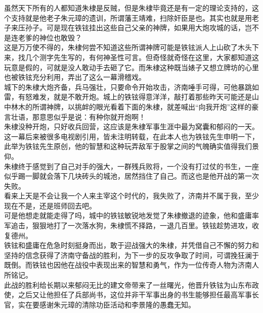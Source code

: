 \begin{multicols}{\theparacolNo}
虽然天下所有的人都知道朱棣是反贼，但是朱棣毕竟还是有一定的理论支持的，这个支持就是他老子朱元璋的遗训，所谓藩王靖难，扫除奸臣是也。其实也就是用老子来压孙子。可是现在铁铉挂出这些自己父亲的神牌，如果用大炮攻城的话，岂不是连老爹的神位也敢毁？\\

这是万万使不得的，朱棣何尝不知道这些所谓神牌可能是铁铉派人上山砍了木头下来，找几个测字先生写的，有何神圣性可言。但奇怪就奇怪在这里，大家都知道这玩意是假的，可就是没人敢动手去砸了它。而朱棣这种既当婊子又想立牌坊的心里也被铁铉充分利用，弄出了这么一幕滑稽戏。\\

城下的朱棣大炮齐备，兵马强壮，只要命令开始攻击，济南唾手可得，可他暴跳如雷，有怒难发，就是不敢开炮。城上的铁铉得意洋洋，敲打着那些昨天可能还是山中林木的所谓神牌，以挑衅的眼光看着下面的朱棣，就差喊出“向我开炮”这样的豪言壮语，那意思似乎是说：有种你就开炮啊！\\

朱棣没种开炮，只好收兵回营，这应该是朱棣军事生涯中最为窝囊和郁闷的一天。\\

这一幕后来被很多电视剧引用，皆未注明转载，在此本人也为铁铉先生申明一下，此举为铁铉先生原创，他的智慧和这种玩弄敌军于股掌之间的气魄确实值得我们景仰。\\

朱棣终于感觉到了自己对手的强大，一群残兵败将，一个没有打过仗的书生，一座似乎踢一脚就会落下几块砖头的城池，居然挡住了自己。而这也是他开战的第一次失败。\\

看来上天是不会让我一个人来主宰这个时代的，我失败了，济南并不属于我，至少现在不是，还是班师回去吧。\\

可是他想走就能走得了吗，城中的铁铉敏锐地发觉了朱棣撤退的迹象，他和盛庸率军追击，狠狠地打了一次落水狗，朱棣慌不择路，一退几百里。铁铉趁势进攻，收复德州。\\

铁铉和盛庸在危急时刻挺身而出，敢于迎战强大的朱棣，并凭借自己不懈的努力和坚持的信念获得了济南守备战的胜利，为下一步的反攻争取了时间，可谓挽狂澜于既倒。而铁铉也因他在战役中表现出来的智慧和勇气，作为一位传奇人物为济南人所铭记。\\

此战的胜利给长期以来郁闷无比的建文帝带来了一丝曙光，他晋升铁铉为山东布政使，之后又让他担任了兵部尚书，这位并非干军事出身的书生能够担任最高军事长官，实在要感谢朱元璋的清除功臣活动和李景隆的愚蠢无知。\\


\end{multicols}
